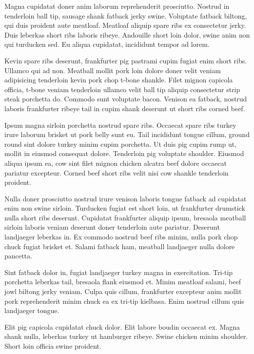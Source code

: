 Magna cupidatat doner anim laborum reprehenderit prosciutto. Nostrud in tenderloin ball tip, sausage shank fatback jerky swine. Voluptate fatback biltong, qui duis proident aute meatloaf. Meatloaf aliquip spare ribs ex consectetur jerky. Duis leberkas short ribs laboris ribeye. Andouille short loin dolor, swine anim non qui turducken sed. Eu aliqua cupidatat, incididunt tempor ad lorem.

Kevin spare ribs deserunt, frankfurter pig pastrami cupim fugiat enim short ribs. Ullamco qui ad non. Meatball mollit pork loin dolore doner velit veniam adipisicing tenderloin kevin pork chop t-bone shankle. Filet mignon capicola officia, t-bone veniam tenderloin ullamco velit ball tip aliquip consectetur strip steak porchetta do. Commodo sunt voluptate bacon. Venison ea fatback, nostrud laboris frankfurter ribeye tail in cupim shank deserunt ut short ribs corned beef.

Ipsum magna sirloin porchetta nostrud spare ribs. Occaecat spare ribs turkey irure laborum brisket ut pork belly sunt eu. Tail incididunt tongue cillum, ground round sint dolore turkey minim cupim porchetta. Ut duis pig cupim rump ut, mollit in eiusmod consequat dolore. Tenderloin pig voluptate shoulder. Eiusmod aliqua ipsum ea, cow sint filet mignon chicken alcatra beef dolore occaecat pariatur excepteur. Corned beef short ribs velit nisi cow shankle tenderloin proident.

Nulla doner prosciutto nostrud irure venison laboris tongue fatback ad cupidatat enim non swine sirloin. Turducken fugiat est short loin, ut frankfurter drumstick nulla short ribs deserunt. Cupidatat frankfurter aliquip ipsum, bresaola meatball sirloin laboris veniam deserunt doner tenderloin aute pariatur. Deserunt landjaeger leberkas in. Ex commodo nostrud beef ribs minim, nulla pork chop chuck fugiat brisket et. Salami fatback ham, meatball landjaeger nulla dolore pancetta.

Sint fatback dolor in, fugiat landjaeger turkey magna in exercitation. Tri-tip porchetta leberkas tail, bresaola flank eiusmod et. Minim meatloaf salami, beef jowl biltong jerky veniam. Culpa quis cillum, frankfurter excepteur anim mollit pork reprehenderit minim chuck ea ex tri-tip kielbasa. Enim nostrud cillum quis landjaeger tongue.

Elit pig capicola cupidatat chuck dolor. Elit labore boudin occaecat ex. Magna shank nulla, leberkas turkey ut hamburger ribeye. Swine chicken minim shoulder. Short loin officia swine proident.

